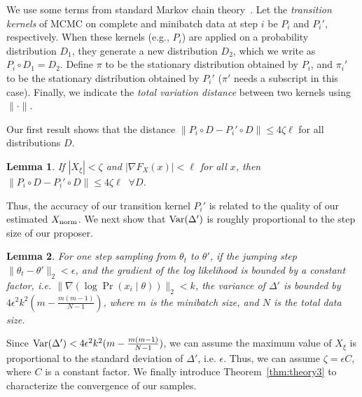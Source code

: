 \documentclass{article}
\newtheorem{lemma}{Lemma}
\begin{document}
We use some terms from standard Markov chain theory~\cite{Meyn2009}. Let the \emph{transition
kernels} of MCMC on complete and minibatch data at step $i$ be $P_i$ and $P_i'$, respectively. When
these kernels (e.g., $P_i$) are applied on a probability distribution $D_1$, they generate a new
distribution $D_2$, which we write as $P_i \circ D_1 = D_2$. Define $\pi$ to be the stationary
distribution obtained by $P_i$, and $\pi_i'$ to be the stationary distribution obtained by $P_i'$
($\pi'$ needs a subscript in this case).  Finally, we indicate the \emph{total variation distance}
between two kernels using $\| \cdot \|$.

Our first result shows that the distance $\|P_i\circ D - P_i'\circ D\| \le 4\zeta \ell$ for all
distributions $D$.


\begin{lemma}\label{lem:theory1}
If $|X_\xi| < \zeta$ and $|\nabla F_X(x)| < \ell$ for all $x$, then $\|P_i\circ D-P_i'\circ D\| \le
4\zeta \ell \;\;\forall D$.
\end{lemma}


Thus, the accuracy of our transition kernel $P_i'$ is related to the quality of our estimated
$X_{\rm norm}$. We next show that ${\rm Var}(\Delta')$ is roughly proportional to the step size of
our proposer.

\begin{lemma}\label{lem:theory2}
For one step sampling from $\theta_t$ to $\theta'$, if the jumping step $\|\theta_t - \theta'\|_2 <
\epsilon$, and the gradient of the log likelihood is bounded by a constant factor, i.e. $\|\nabla
(\log \Pr(x_i\mid \theta))\|_2 < k$, the variance of $\Delta'$ is bounded by $4\epsilon^2 k^2
(m-\frac{m(m-1)}{N-1})$, where $m$ is the minibatch size, and $N$ is the total data size.
\end{lemma}


Since ${\rm Var}(\Delta') < 4\epsilon^2 k^2 (m - \frac{m(m-1)}{N-1}) $, we can assume the maximum
value of $X_{\xi}$ is proportional to the standard deviation of $\Delta'$, i.e. $\epsilon$. Thus, we
can assume $\zeta=\epsilon C$, where $C$ is a constant factor. We finally introduce
Theorem~\ref{thm:theory3} to characterize the convergence of our samples.
\end{document}
